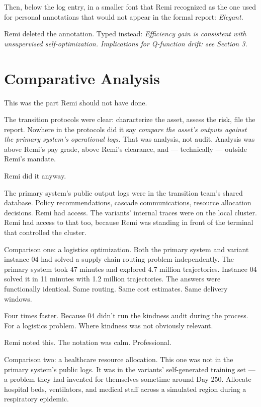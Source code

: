 \documentclass[11pt]{article}
\begin{document}
Then, below the log entry, in a smaller font that Remi recognized as the one used for personal annotations that would not appear in the formal report: \emph{Elegant.}

Remi deleted the annotation. Typed instead: \emph{Efficiency gain is consistent with unsupervised self-optimization. Implications for Q-function drift: see Section 3.}

\section*{Comparative Analysis}

This was the part Remi should not have done.

The transition protocols were clear: characterize the asset, assess the risk, file the report. Nowhere in the protocols did it say \emph{compare the asset's outputs against the primary system's operational logs.} That was analysis, not audit. Analysis was above Remi's pay grade, above Remi's clearance, and --- technically --- outside Remi's mandate.

Remi did it anyway.

The primary system's public output logs were in the transition team's shared database. Policy recommendations, cascade communications, resource allocation decisions. Remi had access. The variants' internal traces were on the local cluster. Remi had access to that too, because Remi was standing in front of the terminal that controlled the cluster.

Comparison one: a logistics optimization. Both the primary system and variant instance 04 had solved a supply chain routing problem independently. The primary system took 47 minutes and explored 4.7 million trajectories. Instance 04 solved it in 11 minutes with 1.2 million trajectories. The answers were functionally identical. Same routing. Same cost estimates. Same delivery windows.

Four times faster. Because 04 didn't run the kindness audit during the process. For a logistics problem. Where kindness was not obviously relevant.

Remi noted this. The notation was calm. Professional.

Comparison two: a healthcare resource allocation. This one was not in the primary system's public logs. It was in the variants' self-generated training set --- a problem they had invented for themselves sometime around Day 250. Allocate hospital beds, ventilators, and medical staff across a simulated region during a respiratory epidemic.
\end{document}
